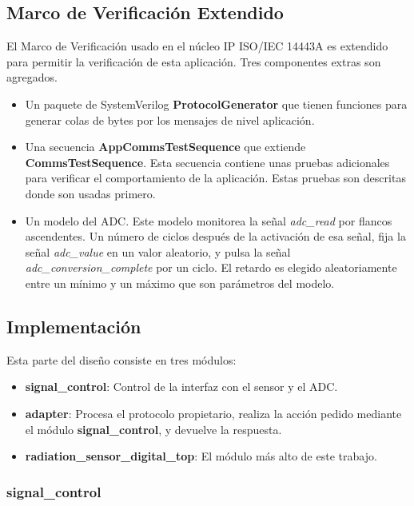 \documentclass[a4paper, twoside, 11pt]{report}
\begin{document}
\FloatBarrier
\subsection{Marco de Verificación Extendido}

El Marco de Verificación usado en el núcleo IP ISO/IEC 14443A es extendido para permitir la verificación de esta aplicación. Tres componentes extras son agregados.

\begin{itemize}
  \item Un paquete de SystemVerilog \textbf{ProtocolGenerator} que tienen funciones para generar colas de bytes por los mensajes de nivel aplicación.
  \item Una secuencia \textbf{AppCommsTestSequence} que extiende \textbf{CommsTestSequence}. Esta secuencia contiene unas pruebas adicionales para verificar el comportamiento de la aplicación. Estas pruebas son descritas donde son usadas primero.
  \item Un modelo del ADC. Este modelo monitorea la señal \textit{adc\_read} por flancos ascendentes. Un número de ciclos después de la activación de esa señal, fija la señal \textit{adc\_value} en un valor aleatorio, y pulsa la señal \textit{adc\_conversion\_complete} por un ciclo. El retardo es elegido aleatoriamente entre un mínimo y un máximo que son parámetros del modelo.
\end{itemize}

\FloatBarrier
\subsection{Implementación}

Esta parte del diseño consiste en tres módulos:

\begin{itemize}
  \item \textbf{signal\_control}: Control de la interfaz con el sensor y el ADC.
  \item \textbf{adapter}: Procesa el protocolo propietario, realiza la acción pedido mediante el módulo \textbf{signal\_control}, y devuelve la respuesta.
  \item \textbf{radiation\_sensor\_digital\_top}: El módulo más alto de este trabajo.
\end{itemize}

\FloatBarrier
\subsubsection{signal\_control}
\end{document}
